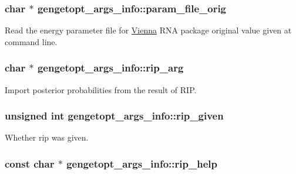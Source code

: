 \hypertarget{structgengetopt__args__info_af063ce92f6e760b3edfd61e488221afb}{
\subsubsection[{param\+\_\+file\+\_\+orig}]{\setlength{\rightskip}{0pt plus 5cm}char $\ast$ gengetopt\+\_\+args\+\_\+info\+::param\+\_\+file\+\_\+orig}}\label{structgengetopt__args__info_af063ce92f6e760b3edfd61e488221afb}


Read the energy parameter file for \hyperlink{namespace_vienna}{Vienna} R\+N\+A package original value given at command line. 

\hypertarget{structgengetopt__args__info_aa613330dba372001de2dfa178b161a1a}{
\subsubsection[{rip\+\_\+arg}]{\setlength{\rightskip}{0pt plus 5cm}char $\ast$ gengetopt\+\_\+args\+\_\+info\+::rip\+\_\+arg}}\label{structgengetopt__args__info_aa613330dba372001de2dfa178b161a1a}


Import posterior probabilities from the result of R\+I\+P. 

\hypertarget{structgengetopt__args__info_ac307b1ec217df5ef31616c14a77627b3}{
\subsubsection[{rip\+\_\+given}]{\setlength{\rightskip}{0pt plus 5cm}unsigned int gengetopt\+\_\+args\+\_\+info\+::rip\+\_\+given}}\label{structgengetopt__args__info_ac307b1ec217df5ef31616c14a77627b3}


Whether rip was given. 

\hypertarget{structgengetopt__args__info_a41b61f6fe469c862d765c45879591857}{
\subsubsection[{rip\+\_\+help}]{\setlength{\rightskip}{0pt plus 5cm}const char $\ast$ gengetopt\+\_\+args\+\_\+info\+::rip\+\_\+help}}\label{structgengetopt__args__info_a41b61f6fe469c862d765c45879591857}


